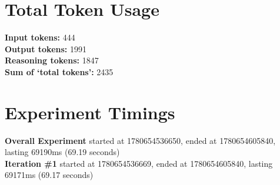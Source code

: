 \documentclass{article}
\begin{document}
\section*{Total Token Usage}
\textbf{Input tokens: }444
\\\textbf{Output tokens: }1991
\\\textbf{Reasoning tokens: }1847
\\\textbf{Sum of `total tokens': }2435
\section*{Experiment Timings}
\textbf{Overall Experiment} started at 1780654536650, ended at 1780654605840, lasting 69190ms (69.19 seconds)
\\\textbf{Iteration \#1} started at 1780654536669, ended at 1780654605840, lasting 69171ms (69.17 seconds)
\end{document}
